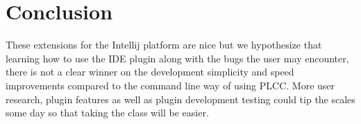 \documentclass[conference, letterpaper]{IEEEtran}
\begin{document}
%





\section{Conclusion}\label{sec:conclusion}
These extensions for the Intellij platform are nice but we hypothesize that learning how to use the IDE plugin along with the bugs the user may encounter, there is not a clear winner on the development simplicity and speed improvements compared to the command line way of using PLCC.
More user research, plugin features as well as plugin development testing could tip the scales some day so that taking the class will be easier.
\end{document}
